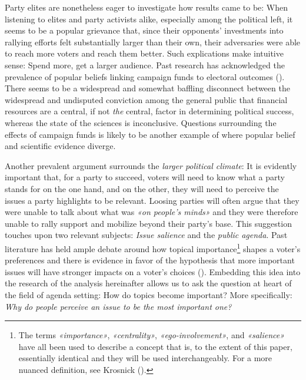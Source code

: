 \documentclass[11pt,a4paper]{article}
\begin{document}
Party elites are nonetheless eager to investigate how results came to be: When listening to elites and party activists alike, especially among the political left, it seems to be a popular grievance that, since their opponents’ investments into rallying efforts felt substantially larger than their own, their adversaries were able to reach more voters and reach them better. Such explications make intuitive sense: Spend more, get a larger audience. Past research has acknowledged the prevalence of popular beliefs linking campaign funds to electoral outcomes (\cite{scott_money_2015, sorauf_inside_1992}). There seems to be a widespread and somewhat baffling disconnect between the widespread and undisputed conviction among the general public that financial resources are a central, if not \textit{the} central, factor in determining political success, whereas the state of the sciences is inconclusive. Questions surrounding the effects of campaign funds is likely to be another example of where popular belief and scientific evidence diverge.

Another prevalent argument surrounds the \textit{larger political climate}: It is evidently important that, for a party to succeed, voters will need to know what a party stands for on the one hand, and on the other, they will need to perceive the issues a party highlights to be relevant. Loosing parties will often argue that they were unable to talk about what was \textit{«on people’s minds»} and they were therefore unable to rally support and mobilize beyond their party’s base. This suggestion touches upon two relevant subjects: \textit{Issue salience} and the \textit{public agenda}. Past literature has held ample debate around how topical importance\footnote{The terms \textit{«importance»}, \textit{«centrality»}, \textit{«ego-involvement»}, and \textit{«salience»} have all been used to describe a concept that is, to the extent of this paper, essentially identical and they will be used interchangeably. For a more nuanced definition, see Krosnick (\citeyear{krosnick_role_1988}).} shapes a voter’s preferences and there is evidence in favor of the hypothesis that more important issues will have stronger impacts on a voter’s choices (\cite{krosnick_role_1988, krosnick_government_1990}). Embedding this idea into the research of the analysis hereinafter allows us to ask the question at heart of the field of agenda setting: How do topics become important? More specifically: \textit{Why do people perceive an issue to be the most important one?}
\end{document}
